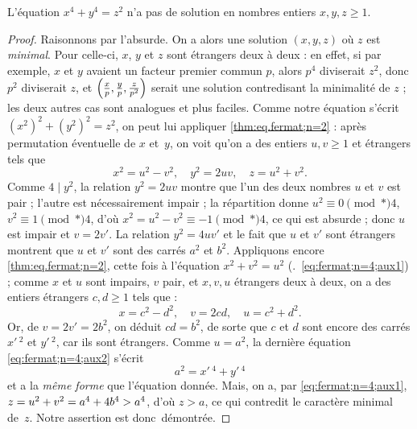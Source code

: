 \documentclass[11pt, useosf,
  title in boldface,
  theorem in new line,
  theorem numbering = section,
  number theorems separately,
]{simplivre}
\begin{document}
    \begin{theorem}\label{thm:eq.fermat;n=4}
        L'équation \( x^4+y^4=z^2 \) n'a pas de solution en nombres entiers \( x,y,z \geqslant 1 \).
    \end{theorem}
    \begin{proof}
        Raisonnons par l'absurde. On a alors une solution \( (x,y,z) \) où \( z \) est \emph{minimal}. Pour celle-ci, \( x \), \( y \) et \( z \) sont étrangers deux à deux : en effet, si par exemple, \( x \) et \( y \) avaient un facteur premier commun \( p \), alors \( p^4 \) diviserait \( z^2 \), donc \( p^2 \) diviserait \( z \), et \( \Bigl(\frac{x\vphantom{y}}{p}, \frac{y}{p}, \frac{z\vphantom{y}}{p^2}\Bigr) \) serait une solution contredisant la minimalité de \( z \) ; les deux autres cas sont analogues et plus faciles. Comme notre équation s'écrit \( (x^2)^2+(y^2)^2 = z^2 \), on peut lui appliquer \cref{thm:eq.fermat;n=2} : après permutation éventuelle de \( x \) et~\( y \), on voit qu'on a des entiers \( u,v \geqslant 1 \) et étrangers tels que
        \begin{equation}\label{eq:fermat;n=4;aux1}
            x^2 = u^2-v^2, \quad
            y^2 = 2uv, \quad
            z = u^2+v^2.
        \end{equation}
        Comme \( 4 \mid y^2 \), la relation \( y^2 = 2uv \) montre que l'un des deux nombres \( u \) et \( v \) est pair ; l'autre est nécessairement impair ; la répartition  donne \( u^2 \equiv 0 \pmod*{4} \), \( v^2 \equiv 1 \pmod*{4} \), d'où \( x^2 = u^2-v^2 \equiv -1 \pmod*{4} \), ce qui est absurde ; donc \( u \) est impair et \( v = 2v' \). La relation \( y^2 = 4uv' \) et le fait que \( u \) et \( v' \) sont étrangers montrent que \( u \) et \( v' \) sont des carrés \( a^2 \) et \( b^2 \). Appliquons encore \cref{thm:eq.fermat;n=2}, cette fois à l'équation \( x^2+v^2=u^2 \) (\cf.~\eqref{eq:fermat;n=4;aux1}) ; comme \( x \) et \( u \) sont impairs, \( v \) pair, et \( x,v,u \) étrangers deux à deux, on a des entiers étrangers \( c, d \geqslant 1 \) tels que :
        \begin{equation}\label{eq:fermat;n=4;aux2}
            x = c^2-d^2, \quad
            v = 2cd, \quad
            u = c^2+d^2.
        \end{equation}
        Or, de \( v = 2v' = 2b^2 \), on déduit \( cd = b^2 \), de sorte que \( c \) et \( d \) sont encore des carrés \( x'\,^2 \) et \( y'\,^2 \), car ils sont étrangers. Comme \( u = a^2 \), la dernière équation \eqref{eq:fermat;n=4;aux2} s'écrit
        \begin{equation}
            a^2 = x'\,^4 + y'\,^4
        \end{equation}
        et a la \emph{même forme} que l'équation donnée. Mais, on a, par \eqref{eq:fermat;n=4;aux1}, \( z = u^2 + v^2 = a^4+4b^4 >\nobreak a^4 \), d'où \( z > a \), ce qui contredit le caractère minimal de~\( z \). Notre assertion est donc~démontrée.
    \end{proof}
\end{document}
